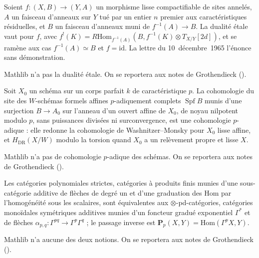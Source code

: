 \begin{encadre}
\begin{theoreme*}\nonverifie
Soient $f : (X, B) \to (Y, A)$ un morphisme lisse compactifiable de sites annelés, $A$ un faisceau d'anneaux sur $Y$ tué par un entier $n$ premier aux caractéristiques résiduelles, et $B$ un faisceau d'anneaux muni de $f^{-1}(A) \to B$. La dualité étale vaut pour $f$, avec $f^!(K) = R\mathrm{Hom}_{f^{-1}(A)}(B, f^{-1}(K) \otimes T_{X/Y}[2d])$, et se ramène aux cas $f^{-1}(A) \simeq B$ et $f = \mathrm{id}$. La lettre du 10~décembre~1965 l'énonce sans démonstration.
\end{theoreme*}
\end{encadre}
{\small Mathlib n'a pas la dualité étale. On se reportera aux notes de Grothendieck ().\par}

\begin{encadre}
\begin{conjecture*}
Soit $X_0$ un schéma sur un corps parfait $k$ de caractéristique $p$. La cohomologie du site des $W$-schémas formels affines $p$-adiquement complets $\operatorname{Spf} B$ munis d'une surjection $B \to A_0$ sur l'anneau d'un ouvert affine de $X_0$, de noyau nilpotent modulo $p$, sans puissances divisées ni surconvergence, est une cohomologie $p$-adique : elle redonne la cohomologie de Washnitzer--Monsky pour $X_0$ lisse affine, et $H_{\mathrm{DR}}(X/W)$ modulo la torsion quand $X_0$ a un relèvement propre et lisse $X$.
\end{conjecture*}
\end{encadre}
{\small Mathlib n'a pas de cohomologie $p$-adique des schémas. On se reportera aux notes de Grothendieck ().\par}

\begin{encadre}
\begin{theoreme*}\nonverifie
Les catégories polynomiales strictes, catégories à produits finis munies d'une sous-catégorie additive de flèches de degré un et d'une graduation des $\mathrm{Hom}$ par l'homogénéité sous les scalaires, sont équivalentes aux $\otimes$-pd-catégories, catégories monoïdales symétriques additives munies d'un foncteur gradué exponentiel $\Gamma^*$ et de flèches $\alpha_{p,q} : \Gamma^{pq} \to \Gamma^p\Gamma^q$ ; le passage inverse est $\mathbf P_p(X, Y) = \mathrm{Hom}(\Gamma^p X, Y)$.
\end{theoreme*}
\end{encadre}
{\small Mathlib n'a aucune des deux notions. On se reportera aux notes de Grothendieck ().\par}
